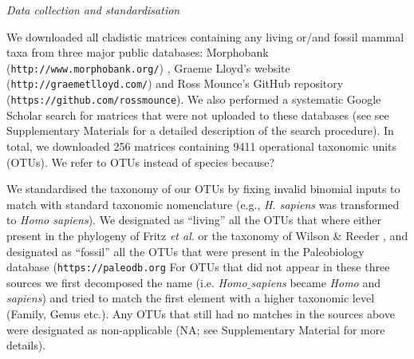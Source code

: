 \documentclass[12pt,letterpaper]{article}
\renewcommand{\subsection}[1]{%
\bigskip
\begin{center}
\begin{large}
\normalfont\itshape #1
\end{large}
\end{center}}
\begin{document}
\subsection{Data collection and standardisation}
We downloaded all cladistic matrices containing any living or/and fossil mammal taxa from three major public databases: Morphobank (\texttt{http://www.morphobank.org/}) \citep{morphobank}, Graeme Lloyd's website (\texttt{http://graemetlloyd.com/}) and Ross Mounce's GitHub repository (\texttt{https://github.com/rossmounce}).
We also performed a systematic Google Scholar search for matrices that were not uploaded to these databases (see see Supplementary Materials for a detailed description of the search procedure).
In total, we downloaded 256 %
matrices containing 9411 %
operational taxonomic units (OTUs). %
We refer to OTUs instead of species because?


We standardised the taxonomy of our OTUs by fixing invalid binomial inputs to match with standard taxonomic nomenclature (e.g., \textit{H. sapiens} was transformed to \textit{Homo sapiens}).
We designated as ``living'' all the OTUs that where either present in the phylogeny of Fritz \textit{et al}. \citep{FritzTree} or the taxonomy of Wilson \& Reeder \citep{wilson2005mammal}, and designated as ``fossil'' all the OTUs that were present in the Paleobiology database (\texttt{https://paleodb.org} %
For OTUs that did not appear in these three sources we first decomposed the name (i.e. \textit{Homo$\_$sapiens} became \textit{Homo} and \textit{sapiens}) and tried to match the first element with a higher taxonomic level (Family, Genus etc.).
Any OTUs that still had no matches in the sources above were designated as non-applicable (NA; see Supplementary Material for more details).
\end{document}
